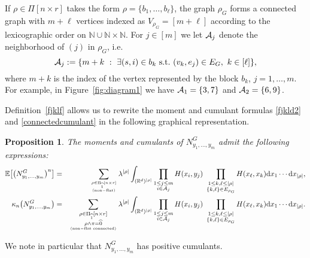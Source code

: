 \documentclass[12pt]{article}
\newcommand{\R}{\mathbb{R}}
\newcommand{\E}{\mathbb{E}}
\newcommand{\inte}{\mathbb{N}}
\newtheorem{prop}{Proposition}[section]
\numberwithin{equation}{section}
\begin{document}
\noindent
 If $\rho\in\Pi[n\times r]$
 takes the form $\rho = \{ b_1,\ldots , b_{\ell}\}$, 
 the graph $\rho_G$ forms a connected graph with
 $m + \ell$ vertices 
 indexed as $V_{\rho_G}=[m+\ell]$ according to the lexicographic order
 on $\inte \cup \inte \times \inte$. For $j \in [m]$ we let ${\cal A}_j$
 denote the neighborhood of $(j)$ in $\rho_G$, i.e.
\begin{equation}
\nonumber
    {\cal A}_j:=\{ m + k \ : \ \exists (s,i)\in b_k ~\mathrm{s.t.}~
    (v_k,e_j) \in E_G, 
    \
    k\in [\ell] \},
\end{equation} 
 where $m+k$ is the index of the vertex represented by 
 the block $b_k$, $j=1,\ldots , m$. 
 For example, in Figure~\ref{fig:diagram1}
 we have ${\cal A}_1=\{3,7\}$ and ${\cal A}_2=\{6,9\}$. 
 
\medskip

\noindent
 Definition~\ref{fjklf} allows us to rewrite the moment and cumulant formulas
 \eqref{fjkld2} and \eqref{connectedcumulant}
in the following graphical representation. 
\begin{prop}\label{mom-cumfor}
  The moments and cumulants of $N_{y_1,\ldots , y_m}^G$ admit
  the following expressions: 
\begin{eqnarray*}
  \E\big[\big(N_{y_1,\ldots , y_m}^G\big)^n\big]&=&\sum_{\rho\in\Pi_{\widehat{1}}[n\times r]
    \atop {\rm (non-flat)}}
  \lambda^{|\rho |}
  \int_{(\R^d)^{|\rho|}}\prod_{\substack{1 \leq j \leq m \\ i\in {\cal A}_j}}
    H(x_i,y_j)
    \ \prod_{
      \substack{1 \leq k , \ell \le|\rho|
        \\
        \{ k , \ell \}\in E_{\rho_G}
    }}H(x_\ell,x_k)\mathrm{d}x_1 \cdots\mathrm{d}x_{|\rho|},\\
    \kappa_n\big(N_{y_1,\ldots , y_m}^G\big)&=&
    \sum_{\substack{\rho\in\Pi_{\widehat{1}}[n\times r]\\\rho\wedge\pi=\widehat{0}} \atop {\rm (non-flat \ \! connected)}}
  \lambda^{|\rho |}
  \int_{(\R^d)^{|\rho|}}\prod_{\substack{1 \leq j \leq m
      \\
    i\in {\cal A}_j}}  H(x_i,y_j)
  \ \prod_{\substack{
      1\leq k , \ell \le|\rho|
      \\
  \{ k , \ell \}\in E_{\rho_G}}}H(x_\ell,x_k)\mathrm{d}x_1\cdots\mathrm{d}x_{|\rho|}.
\end{eqnarray*}
\end{prop}
 We note in particular that $N_{y_1,\ldots , y_m}^G$ has positive cumulants. %
\end{document}
